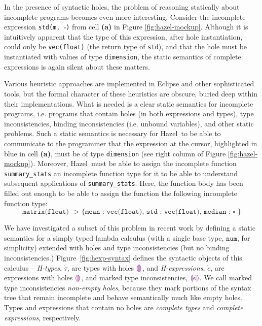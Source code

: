 \documentclass[letterpaper,USenglish]{lipics-v2016}
\let\li\lstinline
\newcommand{\Hazel}[0]{\textsf{Hazel}}
\newcommand{\HazelEnv}[0]{\Hazel}
\newcommand{\llparenthesiscolor}{\textcolor{violet}{\llparenthesis}}
\newcommand{\rrparenthesiscolor}{\textcolor{violet}{\rrparenthesis}}
\newcommand{\htau}{\dot{\tau}}
\newcommand{\tnum}{\texttt{num}}
\newcommand{\tehole}{\llparenthesiscolor\rrparenthesiscolor}
\newcommand{\hexp}{\dot{e}}
\newcommand{\hehole}{\llparenthesiscolor\rrparenthesiscolor}
\newcommand{\hhole}[1]{\llparenthesiscolor#1\rrparenthesiscolor}
\begin{document}
In the presence of syntactic holes, the problem of reasoning statically about incomplete programs 
becomes even more interesting.  Consider the incomplete expression \texttt{std(m,~$\square$)} 
from cell \textbf{(a)} in Figure \ref{fig:hazel-mockup}.
Although it is intuitively apparent that the type of this expression, after hole instantiation, could only be \lstinline{vec(float)} (the return type of \lstinline{std}),
and that the hole must be instantiated with values of type \li{dimension}, the static
semantics of complete expressions is again silent about these matters. 

Various heuristic
approaches are implemented in Eclipse and other sophisticated tools, but the 
formal character of these heuristics are obscure, buried deep within their implementations. What is needed is a clear static semantics for incomplete programs, i.e. programs that contain holes (in both expressions and types), type inconsistencies, binding inconsistencies (i.e. unbound variables), and
other static problems. Such a static semantics is necessary for \HazelEnv~to be able to  
communicate to the programmer that the expression at the cursor, highlighted in blue in cell \textbf{(a)}, must be of type \li{dimension} (see right column of Figure \ref{fig:hazel-mockup}). Moreover, \HazelEnv~must be able to assign the incomplete function
\li{summary_stats} an incomplete function
type for it to be able to understand subsequent applications of \li{summary_stats}. Here, the function body has been filled out enough to be able to assign the function the following incomplete function type:
\[\texttt{matrix(float) -> \{ {mean} : vec(float), std : vec(float), median :~$\square$ \}}\] 

We have investigated a subset of this problem in recent work \cite{popl-paper} by defining a static
semantics for a simply typed lambda calculus (with a 
single base type, $\tnum$, for simplicity) extended with holes and type
inconsistencies (but no binding inconsistencies.) Figure~\ref{fig:hexp-syntax} defines the syntactic
objects of this calculus -- \emph{H-types}, $\htau$,
are types with holes $\tehole$, and \emph{H-expressions}, $\hexp$, are
expressions with holes $\hehole$, and marked type inconsistencies,
$\hhole{\hexp}$. We call marked type inconsistencies \emph{non-empty holes},
because they mark portions of the syntax tree that remain
incomplete and behave semantically much like empty holes. Types and expressions that contain no holes are \emph{complete
  types} and \emph{complete expressions}, respectively.
\end{document}
